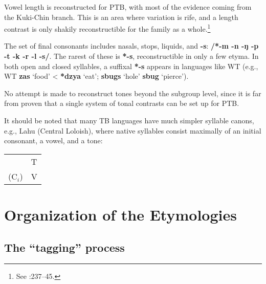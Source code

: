 Vowel length is reconstructed for PTB, with most of the evidence coming from the Kuki-Chin branch. This is an area where variation is rife, and a length contrast is only shakily reconstructible for the family as a whole.\footnote{See \textit{}:237–45.}

The set of final consonants includes nasals, stops, liquids, and \textbf{-s}: \textbf{/*-m -n -ŋ -p -t -k -r -l -s/}. The rarest of these is \textbf{*-s}, reconstructible in only a few etyma. In both open and closed syllables, a suffixal \textbf{*-s} appears in languages like WT (e.g., WT \textbf{zas} ‘food’ < \textbf{*dzya} ‘eat’; \textbf{sbugs} ‘hole’  \textbf{sbug} ‘pierce’).

No attempt is made to reconstruct tones beyond the subgroup level, since it is far from proven that a single system of tonal contrasts can be set up for PTB.

It should be noted that many TB languages have much simpler syllable canons, e.g., Lahu (Central Loloish), where native syllables consist maximally of an initial consonant, a vowel, and a tone:

\begin{table}[h!]
\centering
\begin{tabular}{ll}
	&T\\
($\textrm{C}_i$)	&V\\
\end{tabular}
\end{table}


\section{Organization of the Etymologies}

\subsection{The “tagging” process}

